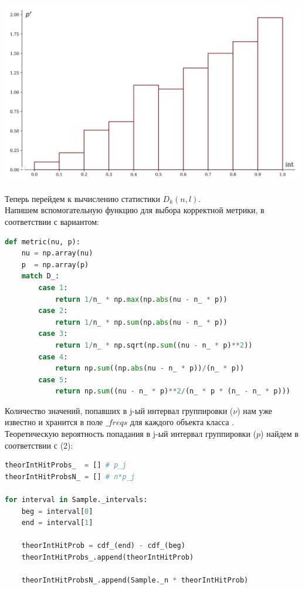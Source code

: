 \documentclass[a4paper, 14pt]{extarticle}
\begin{document}
\begin{minipage}[t]{0.25\textwidth}
\includegraphics[width=\textwidth, height=\textheight, keepaspectratio]{sample36_hist}
\end{minipage}

\newpage{}

Теперь перейдем к вычислению статистики $D_k(n, l)$.\\

Напишем вспомогательную функцию для выбора корректной метрики, в соответствии с вариантом:
\begin{center}
  \begin{lstlisting}[language=Python]
def metric(nu, p):
    nu = np.array(nu)
    p  = np.array(p)
    match D_:
        case 1:
            return 1/n_ * np.max(np.abs(nu - n_ * p))
        case 2:
            return 1/n_ * np.sum(np.abs(nu - n_ * p))
        case 3:
            return 1/n_ * np.sqrt(np.sum((nu - n_ * p)**2))
        case 4:
            return np.sum((np.abs(nu - n_ * p))/(n_ * p))
        case 5:
            return np.sum((nu - n_ * p)**2/(n_ * p * (n_ - n_ * p)))
  \end{lstlisting}
\end{center}

Количество значений, попавших в j-ый интервал группировки ($\nu$) нам уже известно и 
хранится в поле $\_freqs$ для каждого объекта класса . \\

Теоретическую вероятность попадания в j-ый интервал группировки ($p$) найдем в соответствии с 
(2):

\begin{center}
  \begin{lstlisting}[language=Python]
theorIntHitProbs_  = [] # p_j
theorIntHitProbsN_ = [] # n*p_j

for interval in Sample._intervals:
    beg = interval[0]
    end = interval[1]

    theorIntHitProb = cdf_(end) - cdf_(beg)
    theorIntHitProbs_.append(theorIntHitProb)

    theorIntHitProbsN_.append(Sample._n * theorIntHitProb)
  \end{lstlisting}
\end{center}
\end{document}

